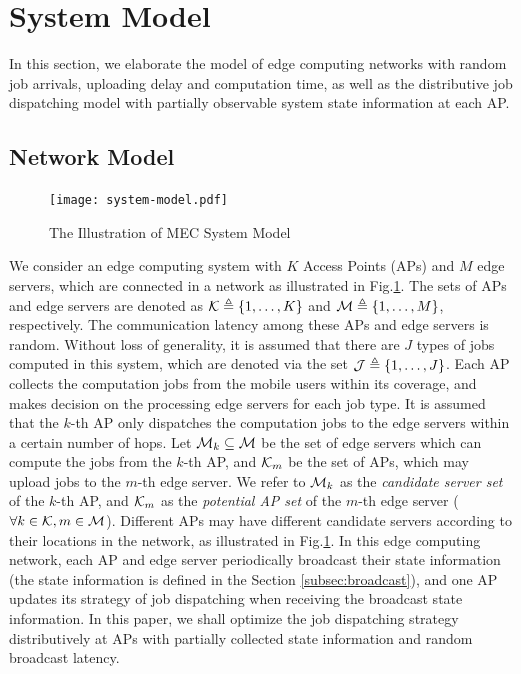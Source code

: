 \section{System Model}
\label{sec:model}
In this section, we elaborate the model of edge computing networks with random job arrivals, uploading delay and computation time, as well as the distributive job dispatching model with partially observable system state information at each AP.
\subsection{Network Model}
\begin{figure}[htp!]
    \centering
    \texttt{[image: system-model.pdf]}
    \caption{The Illustration of MEC System Model}
    \label{fig:system}
\end{figure}

We consider an edge computing system with $K$ Access Points (APs) and $M$ edge servers, which are connected in a network as illustrated in Fig.\ref{fig:system}.
The sets of APs and edge servers are denoted as $\mathcal{K} \triangleq \{1,\dots,K\}$ and $\mathcal{M} \triangleq \{1,\dots,M\}$, respectively.
The communication latency among these APs and edge servers is random.
Without loss of generality, it is assumed that there are $J$ types of jobs computed in this system, which are denoted via the set $\mathcal{J} \triangleq \{1,\dots,J\}$.
Each AP collects the computation jobs from the mobile users within its coverage, and makes decision on the processing edge servers for each job type.
It is assumed that the $k$-th AP only dispatches the computation jobs to the edge servers within a certain number of hops.
Let $\mathcal{M}_{k} \subseteq \mathcal{M}$ be the set of edge servers which can compute the jobs from the $k$-th AP, and $\mathcal{K}_{m}$ be the set of APs, which may upload jobs to the $m$-th edge server.
We refer to $\mathcal{M}_{k}$ as the \emph{candidate server set} of the $k$-th AP, and $\mathcal{K}_{m}$ as the \emph{potential AP set} of the $m$-th edge server ($\forall k\in\mathcal{K}, m\in\mathcal{M}$).
Different APs may have different candidate servers according to their locations in the network, as illustrated in Fig.\ref{fig:system}.
In this edge computing network, each AP and edge server periodically broadcast their state information (the state information is defined in the Section \ref{subsec:broadcast}), and one AP updates its strategy of job dispatching when receiving the broadcast state information.
In this paper, we shall optimize the job dispatching strategy distributively at APs with partially collected state information and random broadcast latency.

